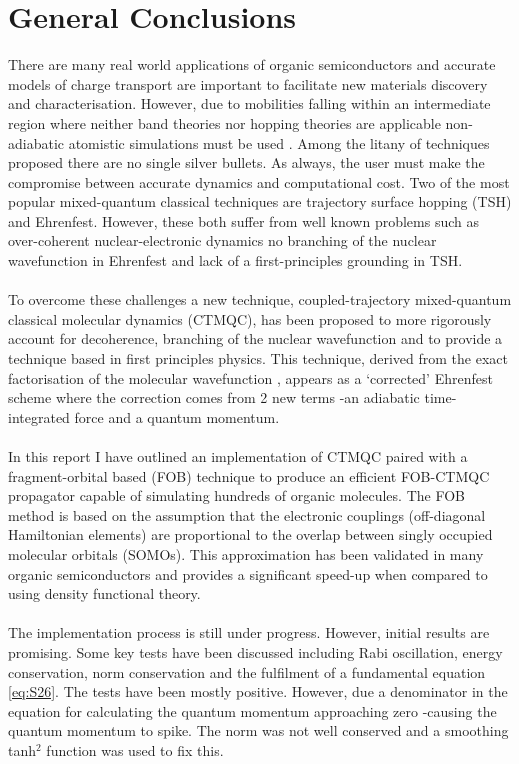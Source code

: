 \chapter{General Conclusions}
\label{Conclusions}
There are many real world applications of organic semiconductors \cite{Anthony2008Jan, Dimitrakopoulos2001Jan, Sasabe2011Feb} and accurate models of charge transport are important to facilitate new materials discovery and characterisation. However, due to mobilities falling within an intermediate region where neither band theories nor hopping theories are applicable non-adiabatic atomistic simulations must be used \cite{oberhofer_charge_2017}. Among the litany of techniques proposed there are no single silver bullets. As always, the user must make the compromise between accurate dynamics and computational cost. Two of the most popular mixed-quantum classical techniques are trajectory surface hopping (TSH) and Ehrenfest. However, these both suffer from well known problems such as over-coherent nuclear-electronic dynamics  no branching of the nuclear wavefunction in Ehrenfest and lack of a first-principles grounding in TSH.
\\\\
To overcome these challenges a new technique, coupled-trajectory mixed-quantum classical molecular dynamics (CTMQC), has been proposed \cite{agostini_semiclassical_2015} to more rigorously account for decoherence, branching of the nuclear wavefunction and to provide a technique based in first principles physics. This technique, derived from the exact factorisation of the molecular wavefunction \cite{abedi_exact_2010}, appears as a `corrected' Ehrenfest scheme where the correction comes from 2 new terms -an adiabatic time-integrated force and a quantum momentum.
\\\\
In this report I have outlined an implementation of CTMQC paired with a fragment-orbital based (FOB) technique to produce an efficient FOB-CTMQC propagator capable of simulating hundreds of organic molecules. The FOB method is based on the assumption that the electronic couplings (off-diagonal Hamiltonian elements) are proportional to the overlap between singly occupied molecular orbitals (SOMOs). This approximation has been validated in many organic semiconductors and provides a significant speed-up when compared to using density functional theory.
\\\\
The implementation process is still under progress. However, initial results are promising. Some key tests have been discussed including Rabi oscillation, energy conservation, norm conservation and the fulfilment of a fundamental equation \eqref{eq:S26}. The tests have been mostly positive. However, due a denominator in the equation for calculating the quantum momentum approaching zero -causing the quantum momentum to spike. The norm was not well conserved and a smoothing tanh$^2$ function was used to fix this.
